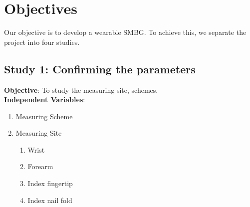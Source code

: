 

\section{Objectives}

Our objective is to develop a wearable SMBG.
To achieve this, we separate the project into four studies.

\subsection{Study 1: Confirming the parameters}

\textbf{Objective}: To study the measuring site, schemes.\\
\textbf{Independent Variables}: 
\begin{enumerate}
    \item Measuring Scheme
    \item Measuring Site
    \begin{enumerate}
        \item Wrist
        \item Forearm
        \item Index fingertip
        \item Index nail fold
    \end{enumerate}
\end{enumerate}

